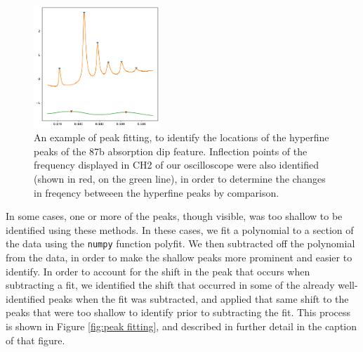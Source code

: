 \documentclass[twocolumn,amsmath,amssymb,pra, floatfix]{revtex4-2}
\begin{document}
\begin{figure}
    \centering
    \includegraphics[width=0.425\textwidth]{figures/87b_1_peaks.pdf}
    \caption{An example of peak fitting, to identify the locations of the hyperfine peaks of the 87b absorption dip feature. Inflection points of the frequency displayed in CH2 of our oscilloscope were also identified (shown in red, on the green line), in order to determine the changes in freqency betweeen the hyperfine peaks by comparison.}
    \label{fig:87b peaks}
\end{figure}

In some cases, one or more of the peaks, though visible, was too shallow to be identified using these methods. In these cases, we fit a polynomial to a section of the data using the \texttt{numpy} function polyfit. We then subtracted off the polynomial from the data, in order to make the shallow peaks more prominent and easier to identify. In order to account for the shift in the peak that occurs when subtracting a fit, we identified the shift that occurred in some of the already well-identified peaks when the fit was subtracted, and applied that same shift to the peaks that were too shallow to identify prior to subtracting the fit. This process is shown in Figure \ref{fig:peak fitting}, and described in further detail in the caption of that figure. 
\end{document}
